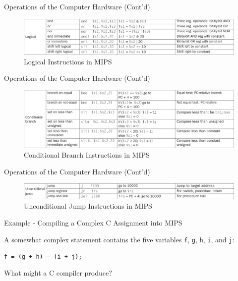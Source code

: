 \begin{frame}{Operations of the Computer Hardware (Cont'd)}
\begin{figure}\caption{Logical Instructions in MIPS}
\begin{center}
\includegraphics[width=\textwidth, height=0.4\textheight]{docs/images/operations-3}
\end{center}
\end{figure}
\end{frame}

\begin{frame}{Operations of the Computer Hardware (Cont'd)}
\begin{figure}\caption{Conditional Branch Instructions in MIPS}
\begin{center}
\includegraphics[width=\textwidth, height=0.5\textheight]{docs/images/operations-4}
\end{center}
\end{figure}
\end{frame}

\begin{frame}{Operations of the Computer Hardware (Cont'd)}
\begin{figure}\caption{Unconditional Jump Instructions in MIPS}
\begin{center}
\includegraphics[width=\textwidth, height=0.17\textheight]{docs/images/operations-5  }
\end{center}
\end{figure}
\end{frame}

\begin{frame}{Example - Compiling a Complex C Assignment into MIPS}
\begin{flushleft}
A somewhat complex statement contains the five variables \texttt{f}, \texttt{g}, \texttt{h}, \texttt{i}, and \texttt{j}:

\hspace{8mm}\texttt{f = (g + h) – (i + j);}

What might a C compiler produce?
\end{flushleft}
\end{frame}


